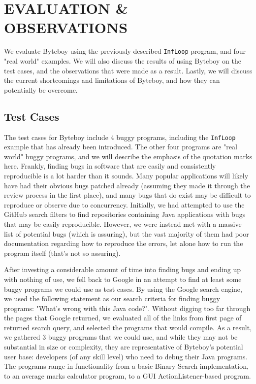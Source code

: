 \documentclass[letterpaper,twocolumn,10pt]{article}
\begin{document}
\section{EVALUATION \& OBSERVATIONS}

We evaluate Byteboy using the previously described {\tt InfLoop} program, and four "real world" examples. We will also discuss the results of using Byteboy on the test cases, and the observations that were made as a result. Lastly, we will discuss the current shortcomings and limitations of Byteboy, and how they can potentially be overcome.

\subsection{Test Cases}

The test cases for Byteboy include 4 buggy programs, including the {\tt InfLoop} example that has already been introduced. The other four programs are "real world" buggy programs, and we will describe the emphasis of the quotation marks here. Frankly, finding bugs in software that are easily and consistently reproducible is a lot harder than it sounds. Many popular applications will likely have had their obvious bugs patched already (assuming they made it through the review process in the first place), and many bugs that do exist may be difficult to reproduce or observe due to concurrency. Initially, we had attempted to use the GitHub search filters to find repositories containing Java applications with bugs that may be easily reproducible. However, we were instead met with a massive list of potential bugs (which is assuring), but the vast majority of them had poor documentation regarding how to reproduce the errors, let alone how to run the program itself (that's not so assuring). 

After investing a considerable amount of time into finding bugs and ending up with nothing of use, we fell back to Google in an attempt to find at least some buggy programs we could use as test cases. By using the Google search engine, we used the following statement as our search criteria for finding buggy programs: "What's wrong with this Java code?". Without digging too far through the pages that Google returned, we evaluated all of the links from first page of returned search query, and selected the programs that would compile. As a result, we gathered 3 buggy programs that we could use, and while they may not be substantial in size or complexity, they are representative of Byteboy's potential user base: developers (of any skill level) who need to debug their Java programs. The programs range in functionality from a basic Binary Search implementation, to an average marks calculator program, to a GUI ActionListener-based program.
\end{document}
